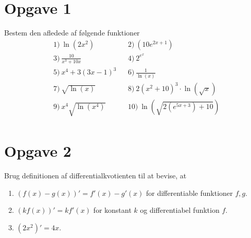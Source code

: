 \section*{Opgave 1}
Bestem den afledede af følgende funktioner
\begin{align*}
&1) \  \ln(2x^2)   &&2) \  (10e^{2x+1})   \\
&3) \  \frac{10}{x^3+10x}   &&4) \ 2^{e^x}    \\
&5) \  x^4+3(3x-1)^3   &&6) \  \frac{1}{\ln(x)}   \\
&7) \   \sqrt{\ln(x)}  &&8) \ 2(x^2+10)^3\cdot\ln(\sqrt{x})    \\
&9) \   x^4\sqrt{\ln(x^4)}  &&10) \  \ln(\sqrt{2(e^{5x+3})+10})  \\
\end{align*}
\section*{Opgave 2}
Brug definitionen af differentialkvotienten til at bevise, at
\begin{enumerate}[label=\roman*)]
\item $(f(x)-g(x))' = f'(x)-g'(x)$ for differentiable funktioner $f,g$.
\item $(kf(x))' = kf'(x)$ for konstant $k$ og differentiabel funktion $f$.
\item $(2x^2)' = 4x$. 
\end{enumerate}